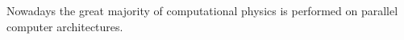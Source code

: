 Nowadays the great majority of computational physics is performed on parallel computer architectures.
